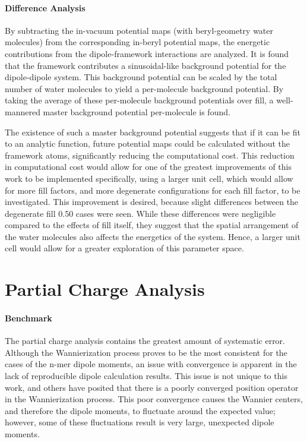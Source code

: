 \paragraph{Difference Analysis} By subtracting the in-vacuum potential maps (with beryl-geometry water molecules) from the corresponding in-beryl potential maps, the energetic contributions from the dipole-framework interactions are analyzed. It is found that the framework contributes a sinusoidal-like background potential for the dipole-dipole system. This background potential can be scaled by the total number of water molecules to yield a per-molecule background potential. By taking the average of these per-molecule background potentials over fill, a well-mannered master background potential per-molecule is found. 

The existence of such a master background potential suggests that if it can be fit to an analytic function, future potential maps could be calculated without the framework atoms, significantly reducing the computational cost. This reduction in computational cost would allow for one of the greatest improvements of this work to be implemented \textemdash specifically, using a larger unit cell, which would allow for more fill factors, and more degenerate configurations for each fill factor, to be investigated. This improvement is desired, because slight differences between the degenerate fill 0.50 cases were seen. While these differences were negligible compared to the effects of fill itself, they suggest that the spatial arrangement of the water molecules also affects the energetics of the system. Hence, a larger unit cell would allow for a greater exploration of this parameter space.

\section{Partial Charge Analysis}

\paragraph{Benchmark} The partial charge analysis contains the greatest amount of systematic error. Although the Wannierization process proves to be the most consistent for the cases of the n-mer dipole moments, an issue with convergence is apparent in the lack of reproducible dipole calculation results. This issue is not unique to this work, and others have posited that there is a poorly converged position operator in the Wannierization process. This poor convergence causes the Wannier centers, and therefore the dipole moments, to fluctuate around the expected value; however, some of these fluctuations result is very large, unexpected dipole moments. 

